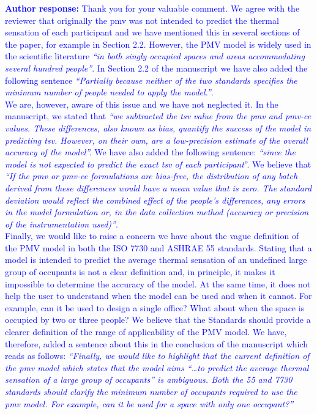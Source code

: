 \documentclass[a4paper, 10pt]{letter}
\newcommand{\response}[1]{\textcolor{blue}{\textbf{Author response:} #1}}
\begin{document}
\begin{letter}
\begin{enumerate}
            \response{
                Thank you for your valuable comment.
                We agree with the reviewer that originally the \ac{pmv} was not intended to predict the thermal sensation of each participant and we have mentioned this in several sections of the paper, for example in Section 2.2.
                However, the PMV model is widely used in the scientific literature \textit{``in both singly occupied spaces and areas accommodating several hundred people''}.
                In Section 2.2 of the manuscript we have also added the following sentence \textit{``Partially because neither of the two standards specifies the minimum number of people needed to apply the model.''}.\\ 
                We are, however, aware of this issue and we have not neglected it.
                In the manuscript, we stated that \textit{``we subtracted the \ac{tsv} value from the \ac{pmv} and \ac{pmv-ce} values.
                These differences, also known as bias, quantify the success of the model in predicting \ac{tsv}.
                However, on their own, are a low-precision estimate of the overall accuracy of the model''.}
                We have also added the following sentence: \textit{``since the model is not expected to predict the exact \ac{tsv} of each participant}''.
                We believe that \textit{``If the \ac{pmv} or \ac{pmv-ce} formulations are bias-free, the distribution of any batch derived from these differences would have a mean value that is zero.
                The standard deviation would reflect the combined effect of the people's differences, any errors in the model formulation or, in the data collection method (accuracy or precision of the instrumentation used)''}.\\
                Finally, we would like to raise a concern we have about the vague definition of the PMV model in both the ISO 7730 and ASHRAE 55 standards.
                Stating that a model is intended to predict the average thermal sensation of an undefined large group of occupants is not a clear definition and, in principle, it makes it impossible to determine the accuracy of the model.
                At the same time, it does not help the user to understand when the model can be used and when it cannot.
                For example, can it be used to design a single office?
                What about when the space is occupied by two or three people?
                We believe that the Standards should provide a clearer definition of the range of applicability of the PMV model. 
                We have, therefore, added a sentence about this in the conclusion of the manuscript which reads as follows: \textit{``Finally, we would like to highlight that the current definition of the \ac{pmv} model which states that the model aims ``\ldots to predict the average thermal sensation of a large group of occupants'' is ambiguous.
                Both the \gls{55} and \gls{7730} standards should clarify the minimum number of occupants required to use the \ac{pmv} model.
                For example, can it be used for a space with only one occupant?''}
            }


\end{enumerate}
\end{letter}
\end{document}
